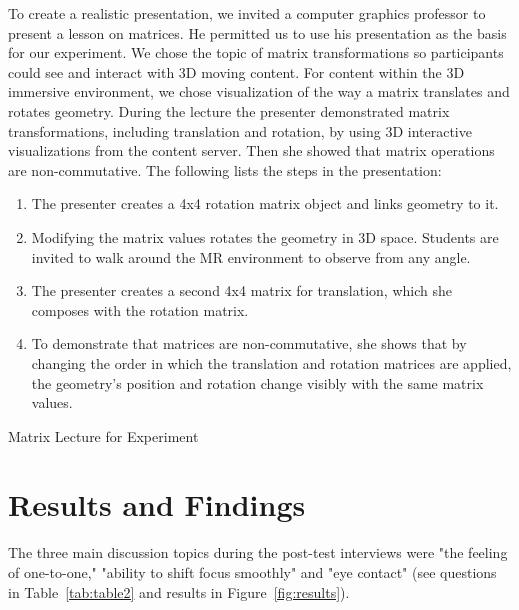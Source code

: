 \documentclass[sigchi-a]{acmart}
\begin{document}
\begin{sidebar}
To create a realistic presentation, we invited a computer graphics professor to present a lesson on matrices. He permitted us to use his presentation as the basis for our experiment.
We chose the topic of matrix transformations so participants could see and interact with 3D moving content. 
For content within the 3D immersive environment, we chose visualization of the way a matrix translates and rotates geometry. 
During the lecture the presenter demonstrated matrix transformations, including translation and rotation, by using 3D interactive visualizations from the content server. Then she showed that matrix operations are non-commutative.
The following lists the steps in the presentation:
\begin{enumerate}
  \item The presenter creates a 4x4 rotation matrix object and links geometry to it. 
  \item Modifying the matrix values rotates the geometry in 3D space. Students are invited to walk around the MR environment to observe from any angle. 
  \item The presenter creates a second 4x4 matrix for translation, which she composes with the rotation matrix.
  \item To demonstrate that matrices are non-commutative, she shows that by changing the order in which the translation and rotation matrices are applied, the geometry's position and rotation change visibly with the same matrix values.
  \end{enumerate}
  \caption{Matrix Lecture for Experiment}
  \label{sidebar:matrix}
\end{sidebar}

\section{Results and Findings}

The three main discussion topics during the post-test interviews were "the feeling of one-to-one," "ability to shift focus smoothly" and "eye contact" (see questions in Table~\ref{tab:table2} and results in Figure~\ref{fig:results}). 
\end{document}

